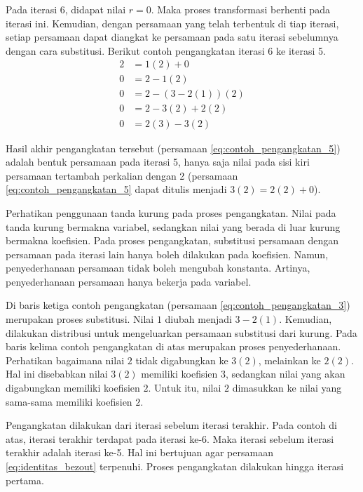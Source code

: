 Pada iterasi 6, didapat nilai $ r = 0 $. Maka proses transformasi berhenti pada iterasi ini. Kemudian, dengan persamaan yang telah terbentuk di tiap iterasi, setiap persamaan dapat diangkat ke persamaan pada satu iterasi sebelumnya dengan cara substitusi. Berikut contoh pengangkatan iterasi 6 ke iterasi 5.
\begin{align}
2 &=1(2)+0 \label{eq:contoh_pengangkatan_1} \\
0 &=2-1(2) \label{eq:contoh_pengangkatan_2} \\
0 &=2-(3-2(1))(2) \label{eq:contoh_pengangkatan_3} \\
0 &=2-3(2)+2(2) \label{eq:contoh_pengangkatan_4} \\
0 &=2(3)-3(2) \label{eq:contoh_pengangkatan_5}
\end{align}

Hasil akhir pengangkatan tersebut (persamaan \eqref{eq:contoh_pengangkatan_5}) adalah bentuk persamaan pada iterasi 5, hanya saja nilai pada sisi kiri persamaan tertambah perkalian dengan 2 (persamaan \eqref{eq:contoh_pengangkatan_5} dapat ditulis menjadi $ 3(2)=2(2)+0 $).

Perhatikan penggunaan tanda kurung pada proses pengangkatan. Nilai pada tanda kurung bermakna variabel, sedangkan nilai yang berada di luar kurung bermakna koefisien. Pada proses pengangkatan, substitusi persamaan dengan persamaan pada iterasi lain hanya boleh dilakukan pada koefisien. Namun, penyederhanaan persamaan tidak boleh mengubah konstanta. Artinya, penyederhanaan persamaan hanya bekerja pada variabel.

Di baris ketiga contoh pengangkatan (persamaan \eqref{eq:contoh_pengangkatan_3}) merupakan proses substitusi. Nilai $ 1 $ diubah menjadi $ 3-2(1) $. Kemudian, dilakukan distribusi untuk mengeluarkan persamaan substitusi dari kurung. Pada baris kelima contoh pengangkatan di atas merupakan proses penyederhanaan. Perhatikan bagaimana nilai $ 2 $ tidak digabungkan ke $ 3(2) $, melainkan ke $ 2(2) $. Hal ini disebabkan nilai $ 3(2) $ memiliki koefisien $ 3 $, sedangkan nilai yang akan digabungkan memiliki koefisien $ 2 $. Untuk itu, nilai $ 2 $ dimasukkan ke nilai yang sama-sama memiliki koefisien $ 2 $.

Pengangkatan dilakukan dari iterasi sebelum iterasi terakhir. Pada contoh di atas, iterasi terakhir terdapat pada iterasi ke-6. Maka iterasi sebelum iterasi terakhir adalah iterasi ke-5. Hal ini bertujuan agar persamaan \eqref{eq:identitas_bezout} terpenuhi. Proses pengangkatan dilakukan hingga iterasi pertama.

